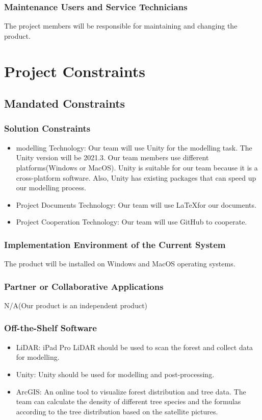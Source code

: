 \documentclass{article}
\begin{document}
\subsubsection{Maintenance Users and Service Technicians}
The project members will be responsible for maintaining and changing the product.

\newpage

\section{Project Constraints}
\subsection{Mandated Constraints}
\subsubsection{Solution Constraints}
\begin{itemize}
\item modelling Technology: Our team will use Unity for
the modelling task. The Unity version will be 2021.3. Our
team members use different platforms(Windows or MacOS).
Unity is suitable for our team because it is a 
cross-platform software. Also, Unity has existing
packages that can speed up our modelling process.
    
\item Project Documents Technology: Our team will use
\LaTeX for our documents.
    
\item Project Cooperation Technology: Our team will use
GitHub to cooperate.
\end{itemize}

\subsubsection{Implementation Environment of the Current System}
The product will be installed on Windows and MacOS 
operating systems.

\subsubsection{Partner or Collaborative Applications}
N/A(Our product is an independent product)

\subsubsection{Off-the-Shelf Software}
\begin{itemize}
\item LiDAR: iPad Pro LiDAR should be used to scan the
forest and collect data for modelling.
\item Unity: Unity should be used for modelling and 
post-processing.
\item ArcGIS: An online tool to visualize forest 
distribution and tree data. The team can calculate the
density of different tree species and the formulas 
according to the tree distribution based on the
satellite pictures.
\end{itemize}
\end{document}
